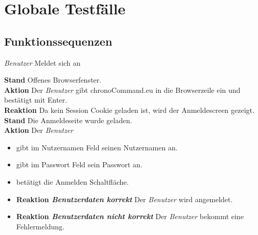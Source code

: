 \section{Globale Testfälle}

\subsection{Funktionssequenzen}
\begin{requirements}
	 \emph{Benutzer} Meldet sich an
	\begin{requirements}
  			    \textbf{Stand} Offenes Browserfenster. \\
  			    \textbf{Aktion} Der \emph{Benutzer} gibt chronoCommand.eu in die Browserzeile ein und bestätigt mit Enter. \\
  			    \textbf{Reaktion} Da kein Session Cookie geladen ist, wird der Anmeldescreen gezeigt.
  			    \textbf{Stand} Die Anmeldeseite wurde geladen.\\
                \textbf{Aktion} Der \emph{Benutzer}
                    \begin{itemize}
                        \item gibt im Nutzernamen Feld seinen Nutzernamen an.
                        \item gibt im Passwort Feld sein Passwort an.
                        \item betätigt die Anmelden Schaltfläche.
                    \end{itemize}
                \begin{itemize}
			\item \textbf{Reaktion \emph{Benutzerdaten korrekt}} Der \emph{Benutzer} wird angemeldet.
			\item \textbf{Reaktion \emph{Benutzerdaten nicht korrekt}} Der \emph{Benutzer} bekommt eine Fehlermeldung.
                \end{itemize}


\end{requirements}
\end{requirements}
